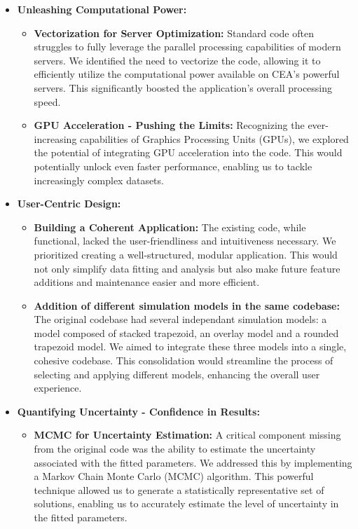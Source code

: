 \begin{itemize}
    \item \textbf{Unleashing Computational Power:}
    \begin{itemize}
        \item \textbf{Vectorization for Server Optimization:} Standard code often struggles to fully leverage the parallel processing capabilities of modern servers. We identified the need to vectorize the code, allowing it to efficiently utilize the computational power available on CEA's powerful servers. This significantly boosted the application's overall processing speed.
        \item \textbf{GPU Acceleration - Pushing the Limits:} Recognizing the ever-increasing capabilities of Graphics Processing Units (GPUs), we explored the potential of integrating GPU acceleration into the code. This would potentially unlock even faster performance, enabling us to tackle increasingly complex datasets.
    \end{itemize}
    \item \textbf{User-Centric Design:}
    \begin{itemize}
        \item \textbf{Building a Coherent Application:} The existing code, while functional, lacked the user-friendliness and intuitiveness necessary. We prioritized creating a well-structured, modular application. This would not only simplify data fitting and analysis but also make future feature additions and maintenance easier and more efficient.
        \item \textbf{Addition of different simulation models in the same codebase:} The original codebase had several independant simulation models: a model composed of stacked trapezoid, an overlay model and a rounded trapezoid model. We aimed to integrate these three models into a single, cohesive codebase. This consolidation would streamline the process of selecting and applying different models, enhancing the overall user experience.
      \end{itemize}
    \item \textbf{Quantifying Uncertainty - Confidence in Results:}
    \begin{itemize}
        \item \textbf{MCMC for Uncertainty Estimation:} A critical component missing from the original code was the ability to estimate the uncertainty associated with the fitted parameters. We addressed this by implementing a Markov Chain Monte Carlo (MCMC) algorithm. This powerful technique allowed us to generate a statistically representative set of solutions, enabling us to accurately estimate the level of uncertainty in the fitted parameters.

\end{itemize}
\end{itemize}
